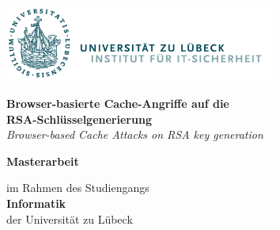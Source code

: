 \begin{titlepage}

{

\vspace*{1cm}

\includegraphics[height=2.5cm]{pictures/its-logo.png}

\vspace*{2.5cm}




\textbf{\LARGE{Browser-basierte Cache-Angriffe auf die\\RSA-Schlüsselgenerierung}} \vspace*{1em} \\
\textit{\LARGE{Browser-based Cache Attacks on RSA key generation}}

\vspace*{2em}

\textbf{Masterarbeit}

\vspace*{1em}

im Rahmen des Studiengangs \\ %
\textbf{Informatik} \\ %
der Universität zu Lübeck %

}
\end{titlepage}
